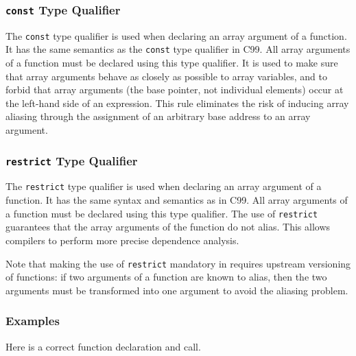\subsubsection{\texttt{const} Type Qualifier}
\label{sec:const}

The \lstinline!const! type qualifier is used when declaring an array argument of a \pencil function.
It
has the same semantics as the \lstinline!const! type qualifier in C99.
All array arguments of a \pencil function
must be declared using this type qualifier.
It is used to make sure that array arguments behave as closely as possible to
array variables, and to forbid that array arguments (the base
pointer, not individual elements) occur at the left-hand side of an
expression.  This rule eliminates the risk of inducing array aliasing
through the assignment of an arbitrary base address to an array
argument.

\subsubsection{\texttt{restrict} Type Qualifier}
\label{sec:restrict}



The \lstinline!restrict! type qualifier is used when declaring an array argument of a \pencil function.
  It has the same syntax and semantics
  as in C99.
  All array arguments of a \pencil function
  must be declared using this type qualifier.
  The use of \lstinline!restrict! guarantees that the array
  arguments of the function do not alias.
  This allows \pencil compilers to
  perform more precise dependence analysis.
  
  Note that making the use of \lstinline!restrict! mandatory in \pencil requires
  upstream versioning of functions: if two arguments of a function are known
  to alias, then the two arguments must be transformed into one argument to
  avoid the aliasing problem.

\subsubsection*{Examples}

Here is a correct \pencil function declaration and call.

